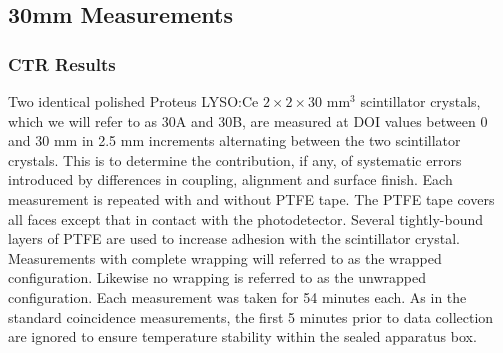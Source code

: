 \subsection{30mm Measurements}
\label{sec:30mm}
\subsubsection{CTR Results}
Two identical polished Proteus LYSO:Ce $2\times2\times30$ mm$^3$ scintillator crystals, which we will refer to as 30A and 30B, are measured at DOI values between 0 and 30 mm in 2.5 mm increments alternating between the two scintillator crystals. This is to determine the contribution, if any, of systematic errors introduced by differences in coupling, alignment and surface finish. Each measurement is repeated with and without PTFE tape. The PTFE tape covers all faces except that in contact with the photodetector. Several tightly-bound layers of PTFE are used to increase adhesion with the scintillator crystal. Measurements with complete wrapping will referred to as the wrapped configuration. Likewise no wrapping is referred to as the unwrapped configuration. Each measurement was taken for 54 minutes each. As in the standard coincidence measurements, the first 5 minutes prior to data collection are ignored to ensure temperature stability within the sealed apparatus box.

